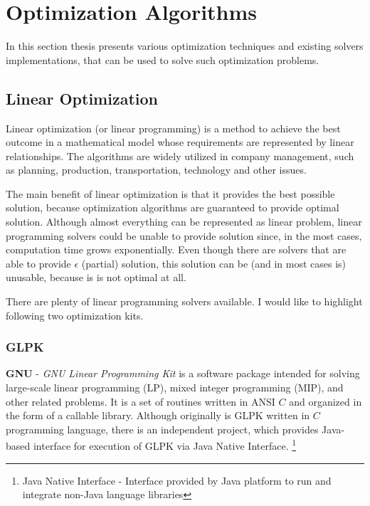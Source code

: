 
\section{Optimization Algorithms}\label{sec:optimization-algorithms}

In this section thesis presents various optimization techniques 
and existing solvers implementations, 
that can be used to solve such optimization problems.

\subsection{Linear Optimization}\label{subsec:linear-optimization}
Linear optimization (or linear programming) is a method to achieve the best outcome in a mathematical model
whose requirements are represented by linear relationships.
The algorithms are widely utilized in company management, such as planning, production, transportation, technology and other issues.

The main benefit of linear optimization is that it provides the best possible solution,
because optimization algorithms are guaranteed to provide optimal solution.
Although almost everything can be represented as linear problem,
linear programming solvers could be unable to provide solution since, in the most cases, computation time grows exponentially.
Even though there are solvers that are able to provide $\epsilon$ (partial) solution,
this solution can be (and in most cases is) unusable, because is is not optimal at all.

\medskip
\noindent There are plenty of linear programming solvers available.
I would like to highlight following two optimization kits.

\subsubsection{GLPK}\label{subsubsec:glpk}
\textbf{GNU} - \textit{GNU Linear Programming Kit} is a software package intended for solving large-scale linear programming (LP),
mixed integer programming (MIP), and other related problems.
It is a set of routines written in ANSI $C$ and organized in the form of a callable library\cite{web:gnuGlpk}.
Although originally is GLPK written in $C$ programming language,
there is an independent project,
which provides Java-based interface for execution of GLPK via Java Native Interface.
\footnote{Java Native Interface - Interface provided by Java platform to run and integrate non-Java language libraries}

